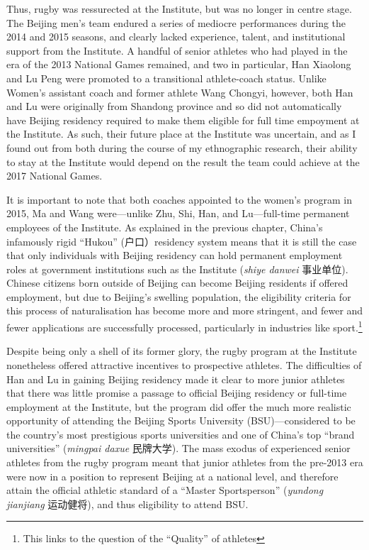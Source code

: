 Thus, rugby was ressurected at the Institute, but was no longer in centre stage. The Beijing men's team endured a series of mediocre performances during the 2014 and 2015 seasons, and clearly lacked experience, talent, and institutional support from the Institute.  A handful of senior athletes who had played in the era of the 2013 National Games remained, and two in particular, Han Xiaolong and Lu Peng were promoted to a transitional athlete-coach status. Unlike Women's assistant coach and former athlete Wang Chongyi, however, both Han and Lu were originally from Shandong province and so did not automatically have Beijing residency required to make them eligible for full time empoyment at the Institute. As such, their future place at the Institute was uncertain, and as I found out from both during the course of my ethnographic research, their ability to stay at the Institute would depend on the result the team could achieve at the 2017 National Games.

It is important to note that both coaches appointed to the women's program in 2015, Ma and Wang were---unlike Zhu, Shi, Han, and Lu---full-time permanent employees of the Institute. As explained in the previous chapter, China's infamously rigid ``Hukou'' (户口）residency system means that it is still the case that only individuals with Beijing residency can hold permanent employment roles at government institutions such as the Institute (\textit{shiye danwei} 事业单位).  Chinese citizens born outside of Beijing can become Beijing residents if offered employment, but due to Beijing's swelling population, the eligibility criteria for this process of naturalisation has become more and more stringent, and fewer and fewer applications are successfully processed, particularly in industries like sport.\footnote{This links to the question of the ``Quality'' of athletes}

Despite being only a shell of its former glory, the rugby program at the Institute nonetheless offered attractive incentives to prospective athletes.  The difficulties of Han and Lu in gaining Beijing residency made it clear to more junior athletes that there was little promise a passage to official Beijing residency or full-time employment at the Institute, but the program did offer the much more realistic opportunity of attending the Beijing Sports University (BSU)---considered to be the country's most prestigious sports universities and one of China's top ``brand universities'' (\textit{mingpai daxue} 民牌大学).  The mass exodus of experienced senior athletes from the rugby program meant that junior athletes from the pre-2013 era were now in a position to represent Beijing at a national level, and therefore attain the official athletic standard of a ``Master Sportsperson'' (\textit{yundong jianjiang} 运动健将), and thus eligibility to attend BSU.


